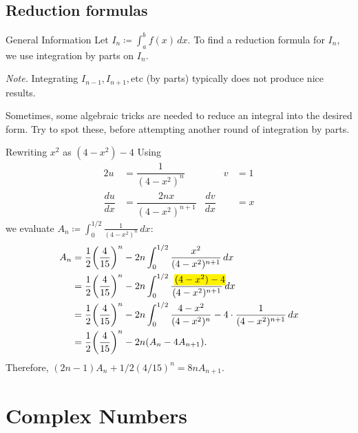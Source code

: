 \documentclass[oneside]{book}
\newcommand{\highlight}[2][red!50]{\mathpalette{\highlightwithstyle[#1]}{#2}}
\newcommand{\highlightwithstyle}[3][red!50]{
  \begingroup                         %
    \sbox0{$\mathsurround 0pt #2#3$}%
    \setlength{\fboxsep}{.5pt}        %
    \sbox2{\hspace{-.5pt}%
      \colorbox{#1}{\usebox0}%
    }%
    \dp2=\dp0 \ht2=\ht0 \wd2=\wd0     %
    \box2                             %
  \endgroup                           %
}
\begin{document}
\section{Reduction formulas}
\begin{stbox}{General Information}{}
  Let \(I_n\coloneq\int_{a}^{b}f(x)\,dx\). To find a reduction formula for \(I_n\), we use integration by parts on \(I_n\).

  \emph{Note.} Integrating \(I_{n-1},I_{n+1},\text{etc}\) (by parts) typically does not produce nice results.  
\end{stbox}
Sometimes, some algebraic tricks are needed to reduce an integral into the desired form. Try to spot these, before attempting another round of integration by parts. 
\begin{example}{Rewriting \(x^2\) as \((4-x^2)-4\)}{}
  Using
   \begin{alignat*}{2}
    u&=\dfrac{1}{(4-x^2)^n} &\qquad  v&=1\\
    \dfrac{du}{dx} &=\dfrac{2nx}{(4-x^2)^{n+1}} & \dfrac{dv}{dx}&=x
   \end{alignat*}
   we evaluate \(A_n\coloneq\int_{0}^{1/2}\frac{1}{(4-x^2)^n}\,dx\):
   \begin{align*}
    A_n&=\frac{1}{2}{\left( \frac{4}{15} \right)^n}-2n\int_{0}^{1/2}\frac{x^2}{(4-x^2)^{n+1}}\,dx\\
    &=\frac{1}{2}{\left( \frac{4}{15} \right)^n}-2n\int_{0}^{1/2}\frac{\highlight[yellow]{(4-x^2)-4}}{(4-x^2)^{n+1}}\,dx\\
    &=\frac{1}{2}{\left( \frac{4}{15} \right)^n}-2n\int_{0}^{1/2}\frac{4-x^2}{(4-x^2)^n}-4\cdot\frac{1}{(4-x^2)^{n+1}}\,dx\\
    &=\frac{1}{2}{\left( \frac{4}{15} \right)^n}-2n(A_n-4A_{n+1}).\\
   \end{align*}
   Therefore, \((2n-1)A_n+1/2(4/15)^n=8nA_{n+1}\).
\end{example}
  \chapter{Complex Numbers}
\end{document}
